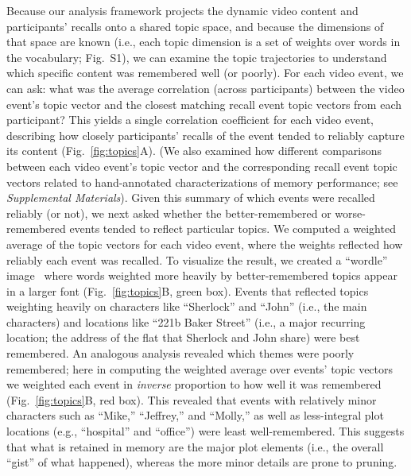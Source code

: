 \documentclass{article}
\newcommand{\topics}{S1}
\begin{document}
Because our analysis framework projects the dynamic video content and participants' recalls onto a shared topic space, and because the dimensions of that space are known (i.e., each topic dimension is a set of weights over words in the vocabulary; Fig.~\topics), we can examine the topic trajectories to understand which specific content was remembered well (or poorly).  For each video event, we can ask: what was the average correlation (across participants) between the video event's topic vector and the closest matching recall event topic vectors from each participant? This yields a single correlation coefficient for each video event, describing how closely participants' recalls of the event tended to reliably capture its content (Fig.~\ref{fig:topics}A).  (We also examined how different comparisons between each video event's topic vector and the corresponding recall event topic vectors related to hand-annotated characterizations of memory performance; see \textit{Supplemental Materials}).  Given this summary of which events were recalled reliably (or not), we next asked whether the better-remembered or worse-remembered events tended to reflect particular topics.  We computed a weighted average of the topic vectors for each video event, where the weights reflected how reliably each event was recalled.  To visualize the result, we created a ``wordle'' image~\citep{MuelEtal18} where words weighted more heavily by better-remembered topics appear in a larger font (Fig.~\ref{fig:topics}B, green box).  Events that reflected topics weighting heavily on characters like ``Sherlock'' and ``John'' (i.e., the main characters) and locations like ``221b Baker Street'' (i.e., a major recurring location; the address of the flat that Sherlock and John share) were best remembered.  An analogous analysis revealed which themes were poorly remembered; here in computing the weighted average over events' topic vectors we weighted each event in \textit{inverse} proportion to how well it was remembered (Fig.~\ref{fig:topics}B, red box).  This revealed that events with relatively minor characters such as ``Mike,'' ``Jeffrey,'' and ``Molly,'' as well as less-integral plot locations (e.g., ``hospital'' and ``office'') were least well-remembered.  This suggests that what is retained in memory are the major plot elements (i.e., the overall ``gist'' of what happened), whereas the more minor details are prone to pruning.
\end{document}
